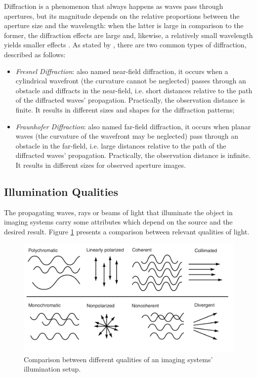 Diffraction is a phenomenon that always happens as waves pass through apertures, but its magnitude depends on the relative proportions between the aperture size and the wavelength: when the latter is large in comparison to the former, the diffraction effects are large and, likewise, a relatively small wavelength yields smaller effects \cite{tipler2007physics}. As stated by , there are two common types of diffraction, described as follows:

\begin{itemize}
    \item \emph{Fresnel Diffraction}: also named near-field diffraction, it occurs when a cylindrical wavefront (the curvature cannot be neglected) passes through an obstacle and diffracts in the near-field, i.e. short distances relative to the path of the diffracted waves' propagation. Practically, the observation distance is finite. It results in different sizes and shapes for the diffraction patterns;
    
    \item \emph{Fraunhofer Diffraction}: also named far-field diffraction, it occurs when planar waves (the curvature of the wavefront may be neglected) pass through an obstacle in the far-field, i.e. large distances relative to the path of the diffracted waves' propagation. Practically, the observation distance is infinite. It results in different sizes for observed aperture images.
    
\end{itemize}


\subsection{Illumination Qualities}

The propagating waves, rays or beams of light that illuminate the object in imaging systems carry some attributes which depend on the source and the desired result. Figure \ref{fig:illumination_qualities} presents a comparison between relevant qualities of light. 


\begin{figure}[htb]
	\centering
	\caption{\label{fig:illumination_qualities} Comparison between different qualities of an imaging systems' illumination setup.}
	\begin{center}
	    \includegraphics[scale=0.4]{images/light_qualities.png}
	\end{center}
	\centering
\end{figure}

